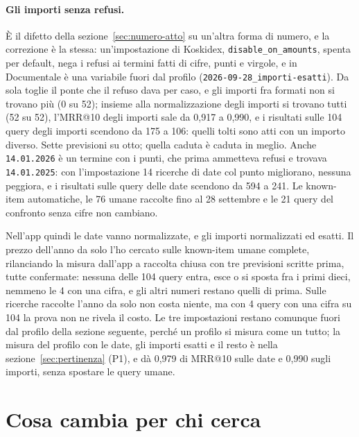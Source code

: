 \paragraph{Gli importi senza refusi.} È il difetto della
sezione~\ref{sec:numero-atto} su un'altra forma di numero, e la correzione è la
stessa: un'impostazione di Koskidex, \texttt{disable\_on\_amounts}, spenta per
default, nega i refusi ai termini fatti di cifre, punti e virgole, e in
Documentale è una variabile fuori dal profilo
(\texttt{2026-09-28\_importi-esatti}). Da sola toglie il ponte che il refuso
dava per caso, e gli importi fra formati non si trovano più (0 su 52); insieme
alla normalizzazione degli importi si trovano tutti (52 su 52), l'MRR@10 degli
importi sale da 0,917 a 0,990, e i risultati sulle 104 query degli importi scendono da 175 a
106: quelli tolti sono atti con un importo diverso. Sette previsioni su otto;
quella caduta è caduta in meglio. Anche \texttt{14.01.2026} è un termine con i
punti, che prima ammetteva refusi e trovava \texttt{14.01.2025}: con
l'impostazione 14 ricerche di date col punto migliorano, nessuna peggiora, e i
risultati sulle query delle date scendono da 594 a 241. Le known-item
automatiche, le 76 umane raccolte fino al 28 settembre e le 21 query del
confronto senza cifre non cambiano.

Nell'app quindi le date vanno normalizzate, e gli importi normalizzati ed
esatti. Il prezzo dell'anno da solo l'ho cercato sulle known-item umane
complete, rilanciando la misura dall'app a raccolta chiusa con tre previsioni
scritte prima, tutte confermate: nessuna delle 104 query entra, esce o si
sposta fra i primi dieci, nemmeno le 4 con una cifra, e gli altri numeri
restano quelli di prima. Sulle ricerche raccolte l'anno da solo non costa
niente, ma con 4 query con una cifra su 104 la prova non ne rivela il costo. Le tre impostazioni restano comunque fuori dal profilo della sezione
seguente, perché un profilo si misura come un tutto; la misura del profilo con
le date, gli importi esatti e il resto è nella sezione~\ref{sec:pertinenza}
(P1), e dà 0,979 di MRR@10 sulle date e 0,990 sugli importi, senza spostare le
query umane.

\section{Cosa cambia per chi cerca}\label{sec:cosa-cambia}

